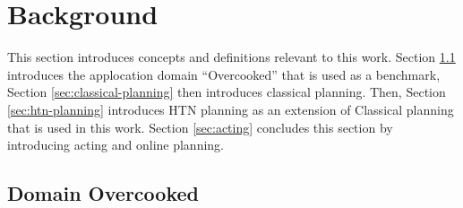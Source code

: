 \section{Background}\label{sec:background}

This section introduces concepts and definitions relevant to this work.
Section \ref{sec:background-domain} introduces the applocation domain ``Overcooked'' that is used as a benchmark,
Section \ref{sec:classical-planning} then introduces classical planning.
Then, Section \ref{sec:htn-planning} introduces HTN planning as an extension of Classical planning that is used in this work.
Section \ref{sec:acting} concludes this section by introducing acting and online planning.


\subsection{Domain Overcooked}\label{sec:background-domain}

